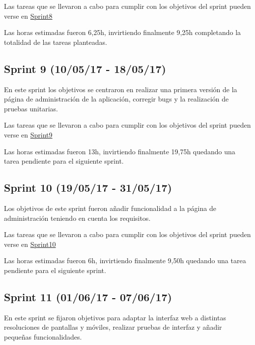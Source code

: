 Las tareas que se llevaron a cabo para cumplir con los objetivos del sprint pueden verse en \href{https://github.com/DanielSantidrian/UBUassistant/milestone/11?closed=1}{Sprint8}

Las horas estimadas fueron 6,25h, invirtiendo finalmente 9,25h completando la totalidad de las tareas planteadas.


\subsection{Sprint 9 (10/05/17 - 18/05/17)}

En este sprint los objetivos se centraron en realizar una primera versión de la página de administración de la aplicación, corregir bugs y la realización de pruebas unitarias.

Las tareas que se llevaron a cabo para cumplir con los objetivos del sprint pueden verse en \href{https://github.com/DanielSantidrian/UBUassistant/milestone/12?closed=1}{Sprint9}

Las horas estimadas fueron 13h, invirtiendo finalmente 19,75h quedando una tarea pendiente para el siguiente sprint.


\subsection{Sprint 10 (19/05/17 - 31/05/17)}

Los objetivos de este sprint fueron añadir funcionalidad a la página de administración teniendo en cuenta los requisitos.

Las tareas que se llevaron a cabo para cumplir con los objetivos del sprint pueden verse en \href{https://github.com/DanielSantidrian/UBUassistant/milestone/13?closed=1}{Sprint10}

Las horas estimadas fueron 6h, invirtiendo finalmente 9,50h quedando una tarea pendiente para el siguiente sprint.


\subsection{Sprint 11 (01/06/17 - 07/06/17)}

En este sprint se fijaron objetivos para adaptar la interfaz web a distintas resoluciones de pantallas y móviles, realizar pruebas de interfaz y añadir pequeñas funcionalidades.

